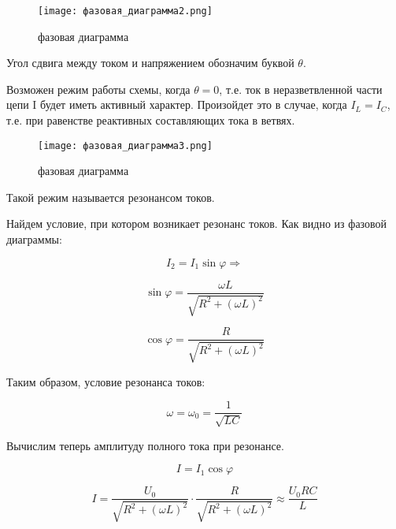     \begin{figure}[h!]
        \centering
        \texttt{[image: фазовая\_диаграмма2.png]}
        \caption{фазовая диаграмма}
    \end{figure}

    \noindent Угол сдвига между током и напряжением обозначим буквой $\theta$.

    \noindent Возможен режим работы схемы, когда $\theta = 0$, 
    т.е. ток в неразветвленной части цепи I будет иметь активный характер. 
    Произойдет это в случае, когда $I_L = I_C$, 
    т.е. при равенстве реактивных составляющих тока в ветвях.

    \begin{figure}[h!]
        \centering
        \texttt{[image: фазовая\_диаграмма3.png]}
        \caption{фазовая диаграмма}
    \end{figure}

    \noindent Такой режим называется резонансом токов.

    \noindent Найдем условие, при котором возникает резонанс токов.
    Как видно из фазовой диаграммы:

    \begin{equation*}
        I_2 = I_1 \sin \varphi \Rightarrow
    \end{equation*}

    \begin{equation*}
        \sin \varphi = \frac{\omega L}{\sqrt{R^2 + (\omega L)^2}}
    \end{equation*}

    \begin{equation*}
        \cos \varphi = \frac{R}{\sqrt{R^2 + (\omega L)^2}}
    \end{equation*}

    Таким образом, условие резонанса токов:

    \begin{equation*}
        \omega = \omega_0 = \frac{1}{\sqrt{LC}}
    \end{equation*}

    Вычислим теперь амплитуду полного тока при резонансе.

    \begin{equation*}
        I = I_1 \cos \varphi
    \end{equation*}

    \begin{equation*}
        I = \frac{U_0}{\sqrt{R^2 + (\omega L)^2}} \cdot \frac{R}{\sqrt{R^2 + (\omega L)^2}} \approx \frac{U_0 R C}{L}
    \end{equation*}

